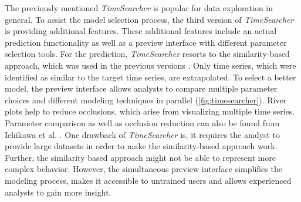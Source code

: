 \documentclass[electronic]{vgtc}             %
\begin{document}
The previously mentioned \textit{TimeSearcher} \cite{Hochheiser:2004, buono:2005} is popular for data exploration in general.
To assist the model selection process, the third version of \textit{TimeSearcher} \cite{buono:2007} is providing additional features.  
These additional features include an actual prediction functionality as well as a preview interface with different parameter selection tools.
For the prediction, \textit{TimeSearcher} resorts to the similarity-based approach, which was used in the previous versions \cite{buono:2005, Hochheiser:2004}.
Only time series, which were identified as similar to the target time series, are extrapolated.
To select a better model, the preview interface allows analysts to compare multiple parameter choices and different modeling techniques in parallel (\autoref{fig:timesearcher}).
River plots help to reduce occlusions, which arise from visualizing multiple time series.
Parameter comparison as well as occlusion reduction can also be found from Ichikawa et al. \cite{ichikawa:2002}.
One drawback of \textit{TimeSearcher} is, it requires the analyst to provide large datasets in order to make the similarity-based approach work.
Further, the similarity based approach might not be able to represent more complex behavior.
However, the simultaneous preview interface simplifies the modeling process, makes it accessible to untrained users and allows experienced analysts to gain more insight.
\end{document}
